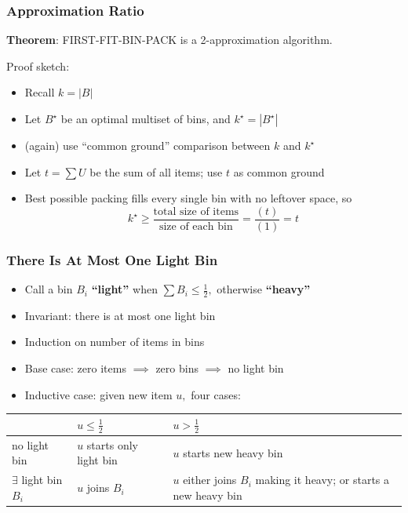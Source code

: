 \documentclass[10pt,aspectratio=169]{beamer}
\begin{document}
\begin{frame} \frametitle{Approximation Ratio}
\textbf{Theorem}: FIRST-FIT-BIN-PACK is a 2-approximation algorithm.

Proof sketch:
\begin{itemize}
  \item Recall $k=|B|$
  \item Let $B^\star$ be an optimal multiset of bins, and $k^\star=|B^\star|$
  \item (again) use ``common ground'' comparison between $k$ and $k^\star$
  \item Let $t = \sum U$ be the sum of all items; use $t$ as common ground
  \item Best possible packing fills every single bin with no leftover space, so
    \[ k^\star \geq \frac{\text{total size of items}}{\text{size of each bin}} = \frac{(t)}{(1)} = t \]
\end{itemize}
\end{frame}

\begin{frame} \frametitle{There Is At Most One Light Bin}
  \begin{itemize}
    \item Call a bin $B_i$ \textbf{``light''} when $\sum B_i \leq \frac{1}{2},$ otherwise \textbf{``heavy''}
    \item Invariant: there is at most one light bin
    \item Induction on number of items in bins
    \item Base case: zero items $\implies$ zero bins $\implies$ no light bin
    \item Inductive case: given new item $u,$ four cases:
  \end{itemize}
  \begin{center}
  \begin{tabular}{l | p{1in} | p{1in} }
        & $u \leq \frac{1}{2}$ & $u > \frac{1}{2}$ \\ \hline
        no light bin & $u$ starts only light bin & $u$ starts new heavy bin \\ \hline
        $\exists$ light bin $B_i$ & $u$ joins $B_i$ & $u$ either joins $B_i$ making it heavy; or starts a new heavy bin \\ \hline
  \end{tabular}
  \end{center}
  \end{frame}
    
\end{document}
